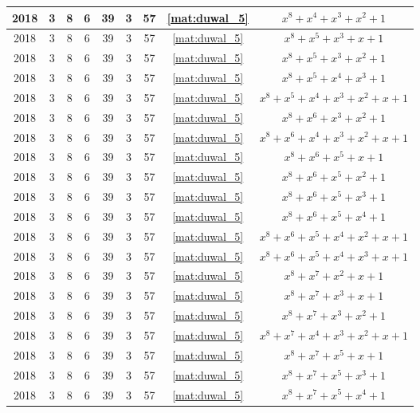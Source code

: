 \begin{longtable}{|c|c|c|c|c|c|c|c|c|}
2018 & 3 & 8 & 6 & 39 & 3 & 57 & \eqref{mat:duwal_5} & $x^8 + x^4 + x^3 + x^2 + 1$ \\ \hline 
2018 & 3 & 8 & 6 & 39 & 3 & 57 & \eqref{mat:duwal_5} & $x^8 + x^5 + x^3 + x + 1$ \\ \hline 
2018 & 3 & 8 & 6 & 39 & 3 & 57 & \eqref{mat:duwal_5} & $x^8 + x^5 + x^3 + x^2 + 1$ \\ \hline 
2018 & 3 & 8 & 6 & 39 & 3 & 57 & \eqref{mat:duwal_5} & $x^8 + x^5 + x^4 + x^3 + 1$ \\ \hline 
2018 & 3 & 8 & 6 & 39 & 3 & 57 & \eqref{mat:duwal_5} & $x^8 + x^5 + x^4 + x^3 + x^2 + x + 1$ \\ \hline 
2018 & 3 & 8 & 6 & 39 & 3 & 57 & \eqref{mat:duwal_5} & $x^8 + x^6 + x^3 + x^2 + 1$ \\ \hline 
2018 & 3 & 8 & 6 & 39 & 3 & 57 & \eqref{mat:duwal_5} & $x^8 + x^6 + x^4 + x^3 + x^2 + x + 1$ \\ \hline 
2018 & 3 & 8 & 6 & 39 & 3 & 57 & \eqref{mat:duwal_5} & $x^8 + x^6 + x^5 + x + 1$ \\ \hline 
2018 & 3 & 8 & 6 & 39 & 3 & 57 & \eqref{mat:duwal_5} & $x^8 + x^6 + x^5 + x^2 + 1$ \\ \hline 
2018 & 3 & 8 & 6 & 39 & 3 & 57 & \eqref{mat:duwal_5} & $x^8 + x^6 + x^5 + x^3 + 1$ \\ \hline 
2018 & 3 & 8 & 6 & 39 & 3 & 57 & \eqref{mat:duwal_5} & $x^8 + x^6 + x^5 + x^4 + 1$ \\ \hline 
2018 & 3 & 8 & 6 & 39 & 3 & 57 & \eqref{mat:duwal_5} & $x^8 + x^6 + x^5 + x^4 + x^2 + x + 1$ \\ \hline 
2018 & 3 & 8 & 6 & 39 & 3 & 57 & \eqref{mat:duwal_5} & $x^8 + x^6 + x^5 + x^4 + x^3 + x + 1$ \\ \hline 
2018 & 3 & 8 & 6 & 39 & 3 & 57 & \eqref{mat:duwal_5} & $x^8 + x^7 + x^2 + x + 1$ \\ \hline 
2018 & 3 & 8 & 6 & 39 & 3 & 57 & \eqref{mat:duwal_5} & $x^8 + x^7 + x^3 + x + 1$ \\ \hline 
2018 & 3 & 8 & 6 & 39 & 3 & 57 & \eqref{mat:duwal_5} & $x^8 + x^7 + x^3 + x^2 + 1$ \\ \hline 
2018 & 3 & 8 & 6 & 39 & 3 & 57 & \eqref{mat:duwal_5} & $x^8 + x^7 + x^4 + x^3 + x^2 + x + 1$ \\ \hline 
2018 & 3 & 8 & 6 & 39 & 3 & 57 & \eqref{mat:duwal_5} & $x^8 + x^7 + x^5 + x + 1$ \\ \hline 
2018 & 3 & 8 & 6 & 39 & 3 & 57 & \eqref{mat:duwal_5} & $x^8 + x^7 + x^5 + x^3 + 1$ \\ \hline 
2018 & 3 & 8 & 6 & 39 & 3 & 57 & \eqref{mat:duwal_5} & $x^8 + x^7 + x^5 + x^4 + 1$ \\ \hline 

\end{longtable}
